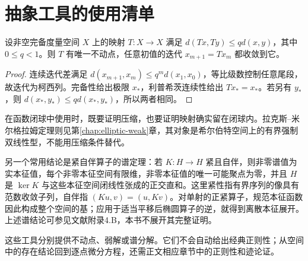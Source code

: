 \section{抽象工具的使用清单}
\begin{theorem}
设非空完备度量空间 $X$ 上的映射 $T:X\to X$ 满足 $d(Tx,Ty)\le qd(x,y)$，其中 $0\le q<1$。则 $T$ 有唯一不动点，任意初值的迭代 $x_{m+1}=Tx_m$ 都收敛到它。
\end{theorem}
\begin{proof}
连续迭代差满足 $d(x_{m+1},x_m)\le q^m d(x_1,x_0)$，等比级数控制任意尾段，故迭代为柯西列。完备性给出极限 $x_*$，利普希茨连续性给出 $Tx_*=x_*$。若另有 $y_*$，则 $d(x_*,y_*)\le qd(x_*,y_*)$，所以两者相同。
\end{proof}
在函数闭球中使用时，既要证明压缩，也要证明映射确实留在闭球内。拉克斯--米尔格拉姆定理则见第\ref{chap:elliptic-weak}章，其对象是希尔伯特空间上的有界强制双线性型，不能用压缩条件替代。

另一个常用结论是紧自伴算子的谱定理：若 $K:H\to H$ 紧且自伴，则非零谱值为实本征值，每个非零本征空间有限维，非零本征值的唯一可能聚点为零，并且 $H$ 是 $\ker K$ 与这些本征空间闭线性张成的正交直和。这里紧性指有界序列的像具有范数收敛子列，自伴指 $(Ku,v)=(u,Kv)$。对单射的正紧算子，规范本征函数因此构成整个空间的基；应用于适当平移后椭圆算子的逆，就得到离散本征展开。上述谱结论可参见文献\cite{hunter}附录4.B，本书不展开其完整证明。

这些工具分别提供不动点、弱解或谱分解。它们不会自动给出经典正则性；从空间中的存在结论回到逐点微分方程，还需正文相应章节中的正则性和迹论证。

